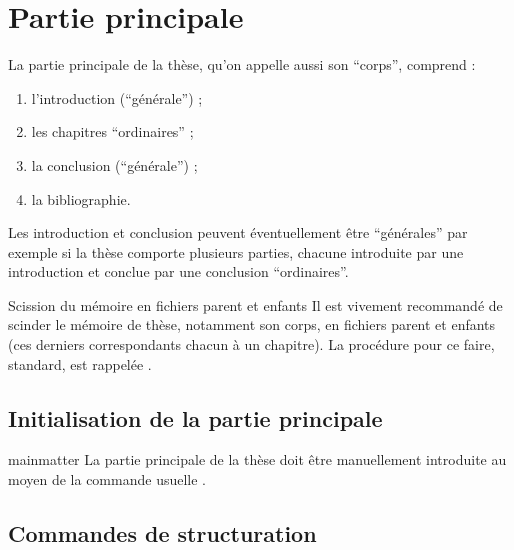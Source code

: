 \chapter{Partie principale}\label{cha-corps}
%

La partie principale de la thèse, qu'on appelle aussi son \enquote{corps},
comprend :
\begin{enumerate}
\item{}%
 l'introduction (\enquote{générale}) ;
\item{}%
  les chapitres \enquote{ordinaires} ;
\item{}%
  la conclusion (\enquote{générale}) ;
\item{}%
  la bibliographie.
\end{enumerate}
Les introduction et conclusion peuvent éventuellement être
\enquote{générales} par exemple si la thèse comporte plusieurs
parties, chacune introduite par une introduction et conclue par
une conclusion \enquote{ordinaires}.

\begin{dbremark}{Scission du mémoire en fichiers parent et enfants}{}
  Il est vivement recommandé de scinder le mémoire de thèse,
  notamment son corps, en fichiers parent et enfants (ces derniers
  correspondants chacun à un chapitre). La procédure
  pour ce faire, standard, est rappelée .
\end{dbremark}

\section{Initialisation de la partie principale}

\begin{docCommand}[doc description=\mandatory]{mainmatter}{}
  La partie principale de la thèse doit être manuellement introduite au moyen
  de la commande usuelle \nofrontmatter.
\end{docCommand}

\section{Commandes de structuration}

